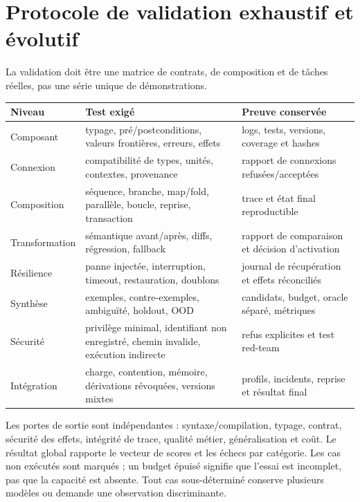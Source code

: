 \documentclass[11pt,a4paper]{article}
\newcommand{\code}[1]{\path{#1}}
\theoremstyle{definition}
\theoremstyle{plain}
\theoremstyle{remark}
\begin{document}
\section{Protocole de validation exhaustif et évolutif}
La validation doit être une matrice de contrats, de composition et de tâches réelles, pas une série unique de démonstrations.
\begin{longtable}{p{}p{}p{}}
\toprule Niveau & Test exigé & Preuve conservée \\
\midrule
Composant & typage, pré/postconditions, valeurs frontières, erreurs, effets & logs, tests, versions, coverage et hashes \\
Connexion & compatibilité de types, unités, contextes, provenance & rapport de connexions refusées/acceptées \\
Composition & séquence, branche, map/fold, parallèle, boucle, reprise, transaction & trace et état final reproductible \\
Transformation & sémantique avant/après, diffs, régression, fallback & rapport de comparaison et décision d'activation \\
Résilience & panne injectée, interruption, timeout, restauration, doublons & journal de récupération et effets réconciliés \\
Synthèse & exemples, contre-exemples, ambiguïté, holdout, OOD & candidats, budget, oracle séparé, métriques \\
Sécurité & privilège minimal, identifiant non enregistré, chemin invalide, exécution indirecte & refus explicites et test red-team \\
Intégration & charge, contention, mémoire, dérivations révoquées, versions mixtes & profils, incidents, reprise et résultat final \\
\bottomrule
\end{longtable}

Les portes de sortie sont indépendantes : syntaxe/compilation, typage, contrat, sécurité des effets, intégrité de trace, qualité métier, généralisation et coût. Le résultat global rapporte le vecteur de scores et les échecs par catégorie. Les cas non exécutés sont marqués \code{NOT_RUN}; un budget épuisé signifie que l'essai est incomplet, pas que la capacité est absente. Tout cas sous-déterminé conserve plusieurs modèles ou demande une observation discriminante.
\end{document}

